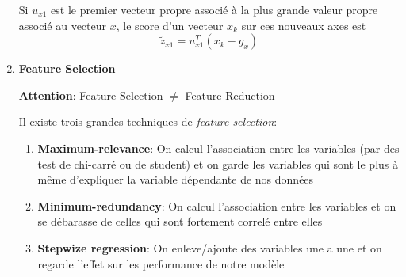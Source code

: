 \documentclass[a4paper, 11pt, onecolumn]{article}
\begin{document}
\begin{enumerate}

Si $u_{x1}$ est le premier vecteur propre associé à la plus grande valeur propre associé au vecteur $x$, le score d'un vecteur $x_k$ sur ces nouveaux axes est
$$\tilde z_{x1} = u_{x1}^T(x_k-g_x)$$

\item \textbf{Feature Selection}

\textbf{Attention}: Feature Selection $\neq$ Feature Reduction

Il existe trois grandes techniques de \textit{feature selection}:
\begin{enumerate}
\item \textbf{Maximum-relevance}: On calcul l'association entre les variables (par des test de chi-carré ou de student) et on garde les variables qui sont le plus à même d'expliquer la variable dépendante de nos données
\item \textbf{Minimum-redundancy}: On calcul l'association entre les variables et on se débarasse de celles qui sont fortement correlé entre elles
\item \textbf{Stepwize regression}: On enleve/ajoute des variables une a une et on regarde l'effet sur les performance de notre modèle
\end{enumerate}


\end{enumerate}
\end{document}
